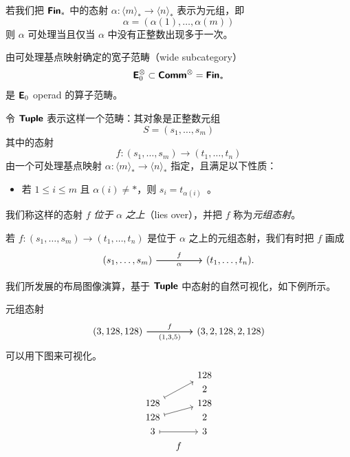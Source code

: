 \begin{remark}
    若我们把 ${\boldsymbol{\mathsf{Fin}}}_*$ 中的态射 $\alpha:\langle m \rangle_* \to \langle n \rangle_*$ 表示为元组，即
    \[
    \alpha = (\alpha(1),\dots,\alpha(m))
    \]
    则 $\alpha$ 可处理当且仅当 $\alpha$ 中没有正整数出现多于一次。
\end{remark}

\begin{aside} 由可处理基点映射确定的宽子范畴（wide subcategory）
\[{\boldsymbol{\mathsf{E}}}_0^\otimes \subset {\boldsymbol{\mathsf{Comm}}}^\otimes = {\boldsymbol{\mathsf{Fin}}}_*\]是 ${\boldsymbol{\mathsf{E}}}_0$ operad 的算子范畴。
\end{aside}



\begin{definition}\label{definitionofTuple} 令 ${\boldsymbol{\mathsf{Tuple}}}$ 表示这样一个范畴：其对象是正整数元组
\[
S = (s_1,\dots,s_m)
\]
其中的态射
\[f:(s_1,\dots,s_m) \to (t_1,\dots,t_n)\]
由一个可处理基点映射 $\alpha:\langle m \rangle_* \to \langle n \rangle_*$
指定，且满足以下性质：
\begin{itemize}
\item 若 $ 1 \leq i \leq m$ 且 $\alpha(i) \neq *$，则 $s_i = t_{\alpha(i)}$~。
\end{itemize}
我们称这样的态射 $f$ {\it 位于} $\alpha$ {\it 之上}（lies over），并把 $f$ 称为{\it 元组态射}。
\end{definition}

\begin{notation}
    若 $f:(s_1,\dots,s_m) \to (t_1,\dots,t_n)$ 是位于 $\alpha$ 之上的元组态射，我们有时把 $f$ 画成
    \[
    \begin{tikzcd}
(s_1,\dots,s_m) \ar[rr,"f"] \ar[rr,swap,"\alpha"] & & (t_1,\dots,t_n).
    \end{tikzcd}
    \]
\end{notation}

我们所发展的布局图像演算，基于 ${\boldsymbol{\mathsf{Tuple}}}$ 中态射的自然可视化，如下例所示。

\begin{example}
\label{morphismfinC} 元组态射
\[
\begin{tikzcd}
(3,128,128) \ar[rr,"f"] \ar[rr,swap,"(1{,}3{,}5)"] & &  (3,2,128,2,128)
\end{tikzcd} \]
可以用下图来可视化。
    \[
    \begin{tikzcd}[row sep = 1, column sep = 8]
     & & 128  \\
     & & 2   \\
     128 \ar[rruu, mapsto] & & 128  \\
     128  \ar[rru,mapsto] & & 2  \\
     3 \ar[rr,mapsto] & & 3  \\
     & f &  \\
    \end{tikzcd}
    \]
    \end{example}


